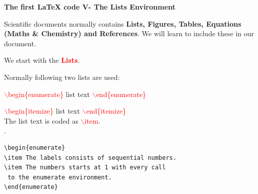 \documentclass[xcolor=dvipsnames]{beamer}
\begin{document}
\begin{frame}[fragile]{\textbf{The first \LaTeX{} code V- The Lists Environment}}



Scientific documents normally contains \textbf{Lists, Figures, Tables, Equations (Maths \& Chemistry) and References}. We will learn to include these in our document.\\
\vspace{0.2cm} 

We start with the \textcolor{red}{\textbf{Lists}}. \\
\vspace{0.2cm} 

Normally following two lists are used:\\
\vspace{0.2cm} 

\textcolor{red}{$\backslash$begin}{\textcolor{red}{\{enumerate\}}} \hspace{0.3cm}list text \hspace{0.3cm} \textcolor{red}{$\backslash$end}{\textcolor{red}{\{enumerate\}}}\\
\vspace{0.2cm}

\textcolor{red}{$\backslash$begin}{\textcolor{red}{\{itemize\}}} \hspace{0.83cm}list text \hspace{0.5cm} \textcolor{red}{$\backslash$end}{\textcolor{red}{\{itemize\}}}
\\
\vspace{0.2cm}
The list text is coded as \textcolor{red}{$\backslash$item}.\\
\vspace{0.05cm}.

\begin{minipage}{10cm}
\begin{Verbatim}[frame=single]
\begin{enumerate}
\item The labels consists of sequential numbers.
\item The numbers starts at 1 with every call
 to the enumerate environment.
\end{enumerate}
\end{Verbatim}
\end{minipage}


\end{frame}
\end{document}
